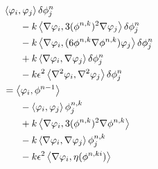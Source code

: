 \documentclass{article}
\newcommand\ang[1]{\left\langle #1 \right\rangle}
\begin{document}
\begin{align}
    &\ang{\varphi_i, \varphi_j}\delta\phi^n_j\\
    &\hspace{4ex}- k\ang{\nabla \varphi_i, 3(\phi^{n,k})^2\nabla\varphi_j}\delta\phi^n_j\\
    &\hspace{4ex}- k\ang{\nabla \varphi_i, (6\phi^{n,k}\nabla\phi^{n,k})\varphi_j}\delta\phi^n_j\\
    &\hspace{4ex}+ k\ang{\nabla \varphi_i, \nabla\varphi_j}\delta\phi^n_j\\
    &\hspace{4ex}- k\epsilon^2\ang{\nabla^2\varphi_i, \nabla^2\varphi_j}\delta\phi^n_j\\
    &= \ang{\varphi_i, \phi^{n-1}}\\
    &\hspace{4ex}-\ang{\varphi_i, \varphi_j}\phi^{n,k}_j\\
    &\hspace{4ex}+k\ang{\nabla\varphi_i, 3(\phi^{n,k})^2\nabla\phi^{n,k}}\\
    &\hspace{4ex}-k\ang{\nabla\varphi_i, \nabla\varphi_j}\phi^{n,k}_j\\
    &\hspace{4ex}-k\epsilon^2\ang{\nabla\varphi_i,\eta(\phi^{n,ki})}
\end{align}
\end{document}
